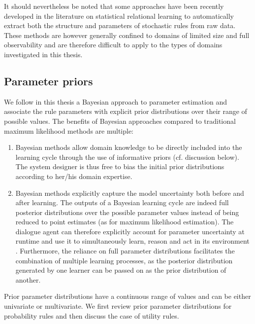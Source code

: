 It should nevertheless be noted that some approaches have been recently developed in the literature on statistical relational learning \citep[see e.g. ][]{PasulaZK07,Kok:2009} to automatically extract both the structure and parameters of stochastic rules from raw data. These methods are however generally confined to domains of limited size and full observability and are therefore difficult to apply to the types of domains investigated in this thesis.  



\subsection{Parameter priors}
\label{sec:rule-params-priors}

We follow in this thesis a Bayesian approach to parameter estimation and associate the rule parameters with explicit prior distributions over their range of possible values.  The benefits of Bayesian approaches compared to traditional maximum likelihood methods are multiple:
\begin{enumerate} 
\item Bayesian methods allow domain knowledge to be directly included into the learning cycle through the use of informative priors (cf. discussion below). The system designer is thus free to bias the initial prior distributions according to her/his domain expertise.
\item Bayesian methods explicitly capture the model uncertainty both before and after learning.  The outputs of a Bayesian learning cycle are indeed full posterior distributions over the possible parameter values instead of being reduced to point estimates (as for maximum likelihood estimation).  The dialogue agent can therefore explicitly account for parameter uncertainty at runtime and use it to simultaneously learn, reason and act in its environment \citep{Ross:2011}. Furthermore, the reliance on full parameter distributions facilitates the combination of multiple learning processes, as the posterior distribution generated by one learner can be passed on as the prior distribution of another. 
\end{enumerate}

Prior parameter distributions have a continuous range of values and can be either univariate or multivariate.  We first review prior parameter distributions for probability rules and then discuss the case of utility rules.  

